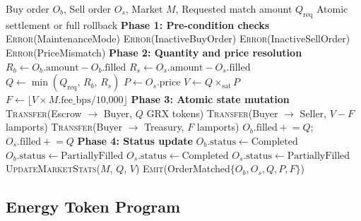 \documentclass[conference]{IEEEtran}
\begin{document}
\begin{algorithm}[htbp]
\caption{Atomic Order Matching with Price-Time Priority}
\label{alg:matching}
\begin{algorithmic}[1]
\REQUIRE Buy order $O_b$, Sell order $O_s$, Market $M$, Requested match amount $Q_{\text{req}}$
\ENSURE Atomic settlement or full rollback
\STATE \textbf{Phase 1: Pre-condition checks}
    \RETURN \textsc{Error}(MaintenanceMode)
\ENDIF
{}
    \RETURN \textsc{Error}(InactiveBuyOrder)
\ENDIF
{}
    \RETURN \textsc{Error}(InactiveSellOrder)
\ENDIF
{}
    \RETURN \textsc{Error}(PriceMismatch)
\ENDIF
\STATE \textbf{Phase 2: Quantity and price resolution}
\STATE $R_b \gets O_b.\text{amount} - O_b.\text{filled}$ 
\STATE $R_s \gets O_s.\text{amount} - O_s.\text{filled}$ 
\STATE $Q \gets \min(Q_{\text{req}},\, R_b,\, R_s)$ 
\STATE $P \gets O_s.\text{price}$ 
\STATE $V \gets Q \times_{\text{sat}} P$ 
\STATE $F \gets \lfloor V \times M.\text{fee\_bps} / 10\text{,}000 \rfloor$ 
\STATE \textbf{Phase 3: Atomic state mutation}
\STATE \textsc{Transfer}(Escrow $\rightarrow$ Buyer, $Q$ GRX tokens)
\STATE \textsc{Transfer}(Buyer $\rightarrow$ Seller, $V - F$ lamports)
\STATE \textsc{Transfer}(Buyer $\rightarrow$ Treasury, $F$ lamports)
\STATE $O_b.\text{filled} \mathrel{+}= Q$; \quad $O_s.\text{filled} \mathrel{+}= Q$
\STATE \textbf{Phase 4: Status update}
    \STATE $O_b.\text{status} \gets \text{Completed}$
\ELSE
    \STATE $O_b.\text{status} \gets \text{PartiallyFilled}$
\ENDIF
{}
    \STATE $O_s.\text{status} \gets \text{Completed}$
\ELSE
    \STATE $O_s.\text{status} \gets \text{PartiallyFilled}$
\ENDIF
\STATE \textsc{UpdateMarketStats}($M$, $Q$, $V$)
\STATE \textsc{Emit}(OrderMatched$\{O_b, O_s, Q, P, F\}$)
\end{algorithmic}
\end{algorithm}

\subsection{Energy Token Program}
\label{sec:energy-token}
\end{document}
